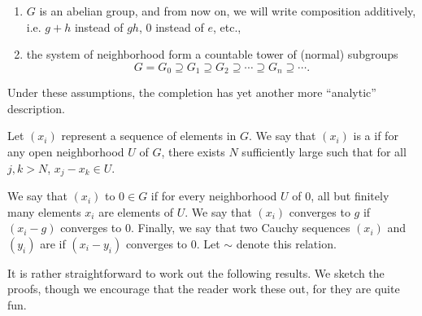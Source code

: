 \begin{enumerate}
\item $G$ is an abelian group, and from now on, we will write
composition additively, i.e. $g + h$ instead of $gh$, $0$ instead
of $e$, etc.,

\item the system of neighborhood form a countable tower of (normal)
subgroups
\[
G = G_0 \supseteq G_1 \supseteq G_2 \supseteq \cdots \supseteq G_n 
\supseteq \cdots.
\]

\end{enumerate}

Under these assumptions, the completion has yet another more 
``analytic'' description.

\begin{defn}
Let $(x_i)$ represent a sequence of elements in $G$. We say that
$(x_i)$ is a  if for
any open neighborhood $U$ of $G$, there exists $N$ sufficiently
large such that for all $j, k > N$, $x_j - x_k \in U$.

We say that $(x_i)$  
to $0 \in G$ if for every neighborhood $U$ of $0$, all but 
finitely many elements $x_i$ are elements of $U$. We say that
$(x_i)$ converges to $g$ if $(x_i - g)$ converges to $0$.
Finally, we say that two Cauchy sequences $(x_i)$ and $(y_i)$ are 
 if $(x_i - y_i)$
converges to $0$. Let $\sim$ denote this relation.
\end{defn}

It is rather straightforward to work out the following results.
We sketch the proofs, though we encourage that the reader work
these out, for they are quite fun.

